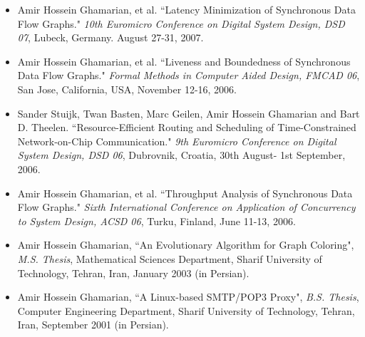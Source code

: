 \begin{itemize}
\item Amir Hossein Ghamarian, et al. ``Latency Minimization of Synchronous Data
Flow Graphs." \emph{10th Euromicro Conference on
Digital System Design, DSD 07}, Lubeck, Germany. August 27-31, 2007.

\item Amir Hossein Ghamarian, et al. ``Liveness and Boundedness of Synchronous Data
Flow Graphs." \emph{Formal Methods in Computer Aided Design, FMCAD
06}, San Jose, California, USA, November 12-16, 2006.

\item Sander Stuijk, Twan Basten, Marc Geilen, Amir Hossein Ghamarian and Bart D.
Theelen. ``Resource-Efficient Routing and Scheduling of
Time-Constrained Network-on-Chip Communication." \emph{9th Euromicro
Conference on Digital System Design, DSD 06}, Dubrovnik, Croatia,
30th August- 1st September, 2006.

\item Amir Hossein Ghamarian, et al.
``Throughput Analysis of Synchronous Data Flow Graphs." \emph{Sixth
International Conference on Application of Concurrency to System
Design, ACSD 06}, Turku, Finland, June 11-13, 2006.

\item Amir Hossein Ghamarian, ``An Evolutionary Algorithm for Graph
Coloring", \emph{M.S. Thesis}, Mathematical Sciences Department,
Sharif University of Technology, Tehran, Iran, January 2003 (in
Persian).

\item Amir Hossein Ghamarian, ``A Linux-based SMTP/POP3 Proxy", \emph{B.S.
Thesis}, Computer Engineering Department, Sharif University of
Technology, Tehran, Iran, September 2001 (in Persian).
\end{itemize}
